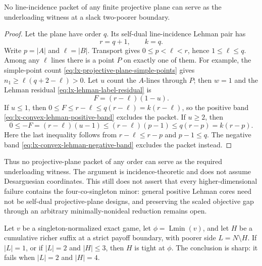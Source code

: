 \begin{corollary}
\label{cor:lx-projective-plane-all-orders}
No line-incidence packet of any finite projective plane can
serve as the underloading witness at a slack two-poorer boundary.
\end{corollary}

\begin{proof}
Let the plane have order $q$.  Its self-dual line-incidence Lehman pair has
\[
 r=q+1,\qquad k=q.
\]
Write $p=|A|$ and $\ell=|B|$.  Transport gives
$0\leq p<\ell<r$, hence $1\leq\ell\leq q$.
Among any $\ell$ lines there is a point $P$ on exactly one of them.  For
example, the simple-point count
\eqref{eq:lx-projective-plane-simple-points} gives
$n_1\geq\ell(q+2-\ell)>0$.  Let $u$ count the $A$-lines through $P$; then
$w=1$ and the Lehman residual \eqref{eq:lx-lehman-label-residual} is
\[
 F=(r-\ell)(1-u).                                  \tag{PP-C}
 \label{eq:lx-projective-plane-two-sided-residual}
\]
If $u\leq1$, then
$0\leq F\leq r-\ell\leq q(r-\ell)=k(r-\ell)$, so the positive band
\eqref{eq:lx-convex-lehman-positive-band} excludes the packet.
If $u\geq2$, then
\[
 0\leq-F=(r-\ell)(u-1)
 \leq(r-\ell)(p-1)
 \leq q(r-p)=k(r-p).
\]
Here the last inequality follows from $r-\ell\leq r-p$ and
$p-1\leq q$.  The negative band
\eqref{eq:lx-convex-lehman-negative-band} excludes the packet instead.
\end{proof}

Thus no projective-plane packet of any order can serve as the required
underloading witness.  The argument is incidence-theoretic and does not
assume Desarguesian coordinates.  This still does not assert that every
higher-dimensional failure contains the four-co-singleton minor: general
positive Lehman cores need not be self-dual projective-plane designs, and
preserving the scaled objective gap through an arbitrary minimally-nonideal
reduction remains open.

\begin{theorem}
\label{thm:lx-small-poorer-threshold}
Let $v$ be a singleton-normalized exact game, let
$\phi=\operatorname{Lmin}(v)$, and let $H$ be a cumulative richer suffix at
a strict payoff boundary, with poorer side $L=N\setminus H$.
If $|L|=1$, or if $|L|=2$ and $|H|\leq3$, then $H$ is tight at $\phi$.
The conclusion is sharp: it fails when $|L|=2$ and $|H|=4$.
\end{theorem}

